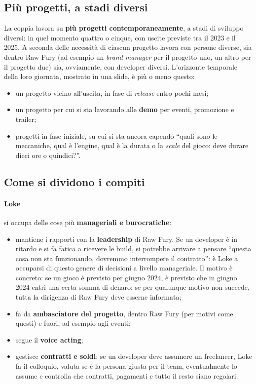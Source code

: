\subsection{Più progetti, a stadi diversi}

La coppia lavora su \textbf{più progetti contemporaneamente}, a stadi di
sviluppo diversi: in quel momento quattro o cinque, con uscite previste tra il
2023 e il 2025. A seconda delle necessità di ciascun progetto lavora con
persone diverse, sia dentro Raw Fury (ad esempio un \emph{brand manager} per
il progetto uno, un altro per il progetto due) sia, ovviamente, con developer
diversi. L'orizzonte temporale della loro giornata, mostrato in una slide, è
più o meno questo:
\begin{itemize}
  \item un progetto vicino all'uscita, in fase di \emph{release} entro pochi
        mesi;
  \item un progetto per cui si sta lavorando alle \textbf{demo} per eventi,
        promozione e trailer;
  \item progetti in fase iniziale, su cui si sta ancora capendo ``quali sono
        le meccaniche, qual è l'engine, qual è la durata o la \emph{scale} del
        gioco: deve durare dieci ore o quindici?''.
\end{itemize}

\subsection{Come si dividono i compiti}

\paragraph{Loke} si occupa delle cose più \textbf{manageriali e burocratiche}:
\begin{itemize}
  \item mantiene i rapporti con la \textbf{leadership} di Raw Fury. Se un
        developer è in ritardo e si fa fatica a ricevere le build, si potrebbe
        arrivare a pensare ``questa cosa non sta funzionando, dovremmo
        interrompere il contratto'': è Loke a occuparsi di questo genere di
        decisioni a livello manageriale. Il motivo è concreto: se un gioco è
        previsto per giugno 2024, è previsto che in giugno 2024 entri una
        certa somma di denaro; se per qualunque motivo non succede, tutta la
        dirigenza di Raw Fury deve esserne informata;
  \item fa da \textbf{ambasciatore del progetto}, dentro Raw Fury (per motivi
        come questi) e fuori, ad esempio agli eventi;
  \item segue il \textbf{voice acting};
  \item gestisce \textbf{contratti e soldi}: se un developer deve assumere un
        freelancer, Loke fa il colloquio, valuta se è la persona giusta per il
        team, eventualmente lo assume e controlla che contratti, pagamenti e
        tutto il resto siano regolari.
\end{itemize}

